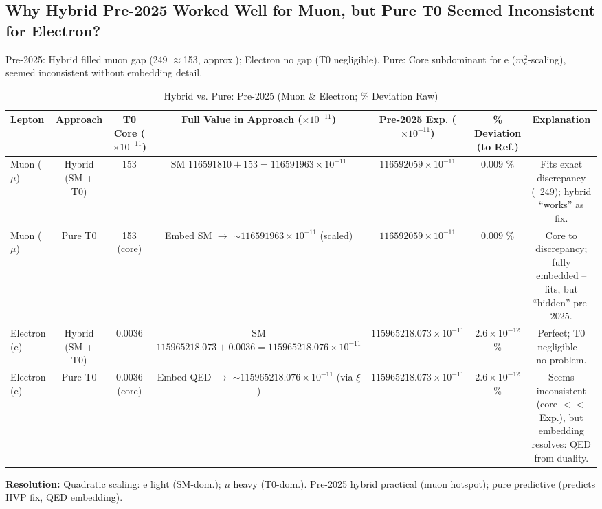\documentclass[12pt,a4paper]{article}
\theoremstyle{definition}
\begin{document}
	\subsection{Why Hybrid Pre-2025 Worked Well for Muon, but Pure T0 Seemed Inconsistent for Electron?}
	
	Pre-2025: Hybrid filled muon gap (249 $\approx$153, approx.); Electron no gap (T0 negligible). Pure: Core subdominant for e ($m_e^2$-scaling), seemed inconsistent without embedding detail.
	
	\begin{table}[ht!]
		\centering
		\small
		\begin{adjustbox}{max width=\textwidth}
			\begin{tabular}{@{}lcccccc@{}}
				\toprule
				Lepton & Approach & T0 Core ($ \times 10^{-11}$) & Full Value in Approach ($ \times 10^{-11}$) & Pre-2025 Exp. ($ \times 10^{-11}$) & \% Deviation (to Ref.) & Explanation \\
				\midrule
				Muon ($\mu$) & Hybrid (SM + T0) & 153 & SM $116591810 + 153 = 116591963 \times 10^{-11}$ & $116592059 \times 10^{-11}$ & $0.009$ \% & Fits exact discrepancy (~249); hybrid ``works'' as fix. \\
				Muon ($\mu$) & Pure T0 & 153 (core) & Embed SM $\to$ $\sim 116591963 \times 10^{-11}$ (scaled) & $116592059 \times 10^{-11}$ & $0.009$ \% & Core to discrepancy; fully embedded -- fits, but ``hidden'' pre-2025. \\
				Electron (e) & Hybrid (SM + T0) & 0.0036 & SM $115965218.073 + 0.0036 = 115965218.076 \times 10^{-11}$ & $115965218.073 \times 10^{-11}$ & $2.6 \times 10^{-12}$ \% & Perfect; T0 negligible -- no problem. \\
				Electron (e) & Pure T0 & 0.0036 (core) & Embed QED $\to$ $\sim 115965218.076 \times 10^{-11}$ (via $\xi$) & $115965218.073 \times 10^{-11}$ & $2.6 \times 10^{-12}$ \% & Seems inconsistent (core $<<$ Exp.), but embedding resolves: QED from duality. \\
				\bottomrule
			\end{tabular}
		\end{adjustbox}
		\caption{Hybrid vs. Pure: Pre-2025 (Muon \& Electron; \% Deviation Raw)}
		\label{tab:hybrid_inconsistency}
	\end{table}
	
	\textbf{Resolution:} Quadratic scaling: e light (SM-dom.); $\mu$ heavy (T0-dom.). Pre-2025 hybrid practical (muon hotspot); pure predictive (predicts HVP fix, QED embedding).
	
\end{document}
